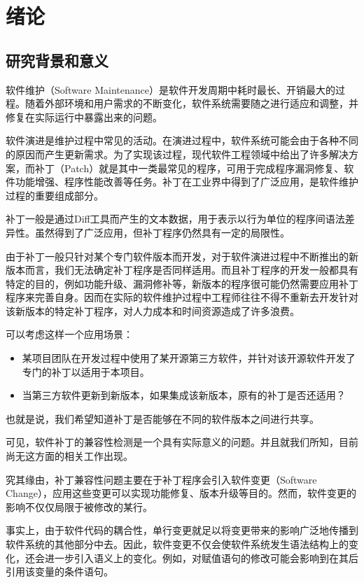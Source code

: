 \chapter{绪论}
\section{研究背景和意义}

软件维护（Software Maintenance）是软件开发周期中耗时最长、开销最大的过程\cite{lehnert2011review}。随着外部环境和用户需求的不断变化，软件系统需要随之进行适应和调整，并修复在实际运行中暴露出来的问题。

软件演进是维护过程中常见的活动\cite{pigoski1996practical}。在演进过程中，软件系统可能会由于各种不同的原因而产生更新需求。为了实现该过程，现代软件工程领域中给出了许多解决方案，而补丁（Patch）就是其中一类最常见的程序，可用于完成程序漏洞修复、软件功能增强、程序性能改善等任务。补丁在工业界中得到了广泛应用，是软件维护过程的重要组成部分\cite{le2014patch}。

补丁一般是通过Diff工具而产生的文本数据\cite{hunt1976algorithm}，用于表示以行为单位的程序间语法差异性。虽然得到了广泛应用，但补丁程序仍然具有一定的局限性。

由于补丁一般只针对某个专门软件版本而开发，对于软件演进过程中不断推出的新版本而言，我们无法确定补丁程序是否同样适用。而且补丁程序的开发一般都具有特定的目的，例如功能升级、漏洞修补等，新版本的程序很可能仍然需要应用补丁程序来完善自身。因而在实际的软件维护过程中工程师往往不得不重新去开发针对该新版本的特定补丁程序，对人力成本和时间资源造成了许多浪费。

可以考虑这样一个应用场景：

\begin{itemize}
	\item 某项目团队在开发过程中使用了某开源第三方软件，并针对该开源软件开发了专门的补丁以适用于本项目。
	\item 当第三方软件更新到新版本，如果集成该新版本，原有的补丁是否还适用？
\end{itemize}

也就是说，我们希望知道补丁是否能够在不同的软件版本之间进行共享。

可见，软件补丁的兼容性检测是一个具有实际意义的问题。并且就我们所知，目前尚无这方面的相关工作出现。

究其缘由，补丁兼容性问题主要在于补丁程序会引入软件变更（Software Change）\cite{buckley2005towards}，应用这些变更可以实现功能修复、版本升级等目的。然而，软件变更的影响不仅仅局限于被修改的某行。

事实上，由于软件代码的耦合性，单行变更就足以将变更带来的影响广泛地传播到软件系统的其他部分中去\cite{wilkerson2012software,tao2012software}。因此，软件变更不仅会使软件系统发生语法结构上的变化，还会进一步引入语义上的变化。例如，对赋值语句的修改可能会影响到在其后引用该变量的条件语句。

